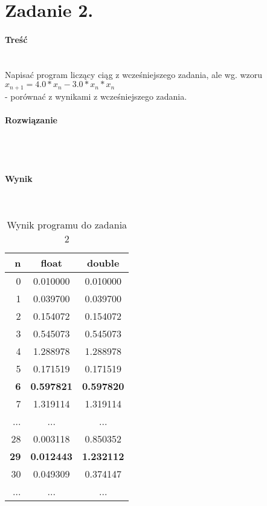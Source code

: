 \section*{Zadanie 2.} \label{sec:Zadanie2}

\paragraph{Treść} ~\\
Napisać program liczący ciąg z wcześniejszego zadania, ale wg. wzoru \\
$ x_{n+1} = 4.0 * x_{n} - 3.0 * x_{n} * x_{n} $ \\
- porównać z wynikami z wcześniejszego zadania. \\

\paragraph{Rozwiązanie} ~\\
 ~\\

\paragraph{Wynik} ~\\
\begin{table}[h]
  \centering
  \begin{tabular}{r|c|c}
    n & float & double \\
    \hline 0 & 0.010000 & 0.010000 \\
    \hline 1 & 0.039700 & 0.039700 \\
    \hline 2 & 0.154072 & 0.154072 \\
    \hline 3 & 0.545073 & 0.545073 \\
    \hline 4 & 1.288978 & 1.288978 \\
    \hline 5 & 0.171519 & 0.171519 \\
    \hline \textbf{6} & \textbf{0.597821} & \textbf{0.597820} \\
    \hline 7 & 1.319114 & 1.319114 \\
    \hline ... & ... & ... \\
    \hline 28 & 0.003118 & 0.850352 \\
    \hline \textbf{29} & \textbf{0.012443} & \textbf{1.232112} \\
    \hline 30 & 0.049309 & 0.374147 \\
    \hline ... & ... & ... \\
    \hline
  \end{tabular}
  \caption{Wynik programu do zadania 2}
  \label{tab:WynikProgramuDoZadania2}
\end{table}

